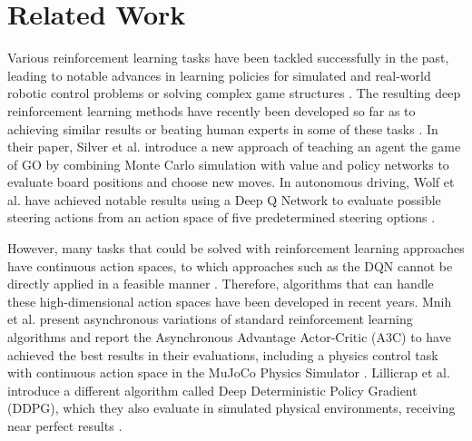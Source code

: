 \documentclass[letterpaper, 10 pt, conference]{ieeeconf}  %
\begin{document}

\section{Related Work}

Various reinforcement learning tasks have been tackled successfully in the past, leading to notable advances in learning policies for simulated and real-world robotic control problems \cite{Levine:2013:GPS:3042817.3042937}\cite{Bruin2015TheIO} or solving complex game structures \cite{Schaul2015PrioritizedER}. The resulting deep reinforcement learning methods have recently been developed so far as to achieving similar results or beating human experts in some of these tasks \cite{44806}\cite{mnih2015humanlevel}. In their paper, Silver et al. introduce a new approach of teaching an agent the game of GO by combining Monte Carlo simulation with value and policy networks to evaluate board positions and choose new moves. In autonomous driving, Wolf et al. have achieved notable results using a Deep Q Network to evaluate possible steering actions from an action space of five predetermined steering options \cite{7995727}. 

However, many tasks that could be solved with reinforcement learning approaches have continuous action spaces, to which approaches such as the DQN cannot be directly applied in a feasible manner \cite{lillicrapContinuousControlDeep2015}. Therefore, algorithms that can handle these high-dimensional action spaces have been developed in recent years. Mnih et al. present asynchronous variations of standard reinforcement learning algorithms and report the Asynchronous Advantage Actor-Critic (A3C) to have achieved the best results in their evaluations, including a physics control task with continuous action space in the MuJoCo Physics Simulator \cite{mnihAsynchronousMethodsDeep2016}. Lillicrap et al. introduce a different algorithm called Deep Deterministic Policy Gradient (DDPG), which they also evaluate in simulated physical environments, receiving near perfect results \cite{mnih2013playing}.
\end{document}
